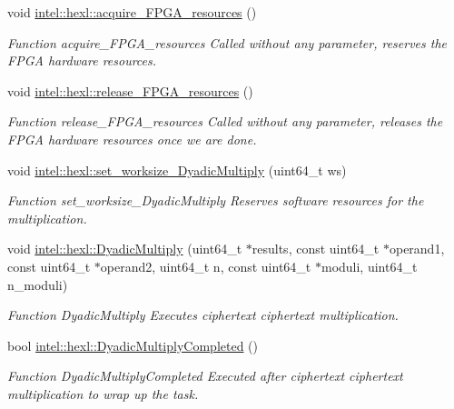 \begin{DoxyCompactItemize}
\item 
void \hyperlink{namespaceintel_1_1hexl_a6236e14eaac1602475c5f4e0a42754fe}{intel\-::hexl\-::acquire\-\_\-\-F\-P\-G\-A\-\_\-resources} ()
\begin{DoxyCompactList}\small\item\em Function acquire\-\_\-\-F\-P\-G\-A\-\_\-resources Called without any parameter, reserves the F\-P\-G\-A hardware resources. \end{DoxyCompactList}\item 
void \hyperlink{namespaceintel_1_1hexl_a717589c6dbfa6429b61e42c620d72d89}{intel\-::hexl\-::release\-\_\-\-F\-P\-G\-A\-\_\-resources} ()
\begin{DoxyCompactList}\small\item\em Function release\-\_\-\-F\-P\-G\-A\-\_\-resources Called without any parameter, releases the F\-P\-G\-A hardware resources once we are done. \end{DoxyCompactList}\item 
void \hyperlink{namespaceintel_1_1hexl_a0721fea3151425a86da2201107e3ddcc}{intel\-::hexl\-::set\-\_\-worksize\-\_\-\-Dyadic\-Multiply} (uint64\-\_\-t ws)
\begin{DoxyCompactList}\small\item\em Function set\-\_\-worksize\-\_\-\-Dyadic\-Multiply Reserves software resources for the multiplication. \end{DoxyCompactList}\item 
void \hyperlink{namespaceintel_1_1hexl_ae4e26f2cb97a43a2b81fe8643b6edf17}{intel\-::hexl\-::\-Dyadic\-Multiply} (uint64\-\_\-t $\ast$results, const uint64\-\_\-t $\ast$operand1, const uint64\-\_\-t $\ast$operand2, uint64\-\_\-t n, const uint64\-\_\-t $\ast$moduli, uint64\-\_\-t n\-\_\-moduli)
\begin{DoxyCompactList}\small\item\em Function Dyadic\-Multiply Executes ciphertext ciphertext multiplication. \end{DoxyCompactList}\item 
bool \hyperlink{namespaceintel_1_1hexl_a638ef00009ae573955d1138b9fb03363}{intel\-::hexl\-::\-Dyadic\-Multiply\-Completed} ()
\begin{DoxyCompactList}\small\item\em Function Dyadic\-Multiply\-Completed Executed after ciphertext ciphertext multiplication to wrap up the task. \end{DoxyCompactList}\item 

\end{DoxyCompactItemize}
